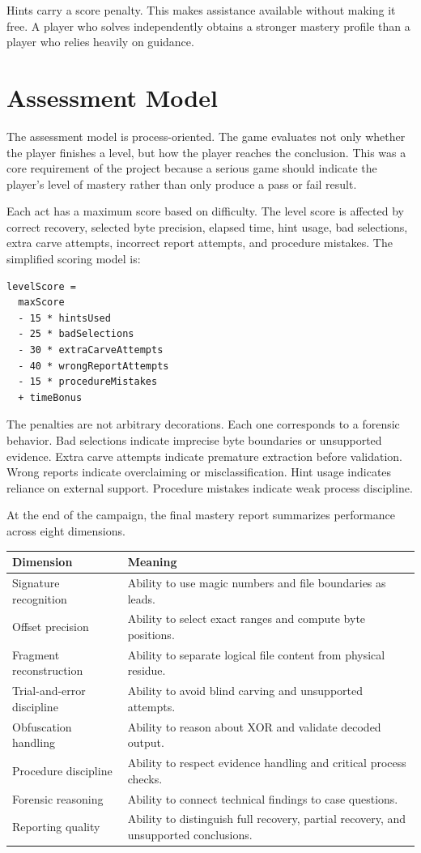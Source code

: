 \documentclass[11pt,a4paper]{article}
\begin{document}
Hints carry a score penalty. This makes assistance available without making it free. A player who solves independently obtains a stronger mastery profile than a player who relies heavily on guidance.

\section{Assessment Model}

The assessment model is process-oriented. The game evaluates not only whether the player finishes a level, but how the player reaches the conclusion. This was a core requirement of the project because a serious game should indicate the player's level of mastery rather than only produce a pass or fail result.

Each act has a maximum score based on difficulty. The level score is affected by correct recovery, selected byte precision, elapsed time, hint usage, bad selections, extra carve attempts, incorrect report attempts, and procedure mistakes. The simplified scoring model is:

\begin{verbatim}
levelScore =
  maxScore
  - 15 * hintsUsed
  - 25 * badSelections
  - 30 * extraCarveAttempts
  - 40 * wrongReportAttempts
  - 15 * procedureMistakes
  + timeBonus
\end{verbatim}

The penalties are not arbitrary decorations. Each one corresponds to a forensic behavior. Bad selections indicate imprecise byte boundaries or unsupported evidence. Extra carve attempts indicate premature extraction before validation. Wrong reports indicate overclaiming or misclassification. Hint usage indicates reliance on external support. Procedure mistakes indicate weak process discipline.

At the end of the campaign, the final mastery report summarizes performance across eight dimensions.

\begin{longtable}{p{}p{}}
\toprule
\textbf{Dimension} & \textbf{Meaning} \\
\midrule
Signature recognition & Ability to use magic numbers and file boundaries as leads. \\
Offset precision & Ability to select exact ranges and compute byte positions. \\
Fragment reconstruction & Ability to separate logical file content from physical residue. \\
Trial-and-error discipline & Ability to avoid blind carving and unsupported attempts. \\
Obfuscation handling & Ability to reason about XOR and validate decoded output. \\
Procedure discipline & Ability to respect evidence handling and critical process checks. \\
Forensic reasoning & Ability to connect technical findings to case questions. \\
Reporting quality & Ability to distinguish full recovery, partial recovery, and unsupported conclusions. \\
\bottomrule
\end{longtable}
\end{document}
